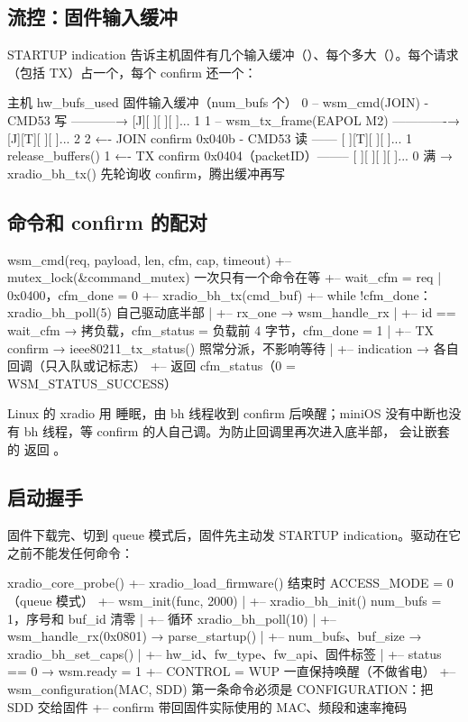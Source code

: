 \subsection{流控：固件输入缓冲}

STARTUP indication 告诉主机固件有几个输入缓冲（）、每个多大（）。每个请求（包括 TX）占一个，每个 confirm 还一个：

\begin{txtcode}
主机 hw_bufs_used                          固件输入缓冲（num_bufs 个）
0 -- wsm_cmd(JOIN) - CMD53 写 -----------→ [J][ ][ ][ ]...        1
1 -- wsm_tx_frame(EAPOL M2) -------------→ [J][T][ ][ ]...        2
2 ←- JOIN confirm 0x040b - CMD53 读 ------ [ ][T][ ][ ]...        1   release_buffers()
1 ←- TX confirm 0x0404（packetID）-------- [ ][ ][ ][ ]...        0
满 → xradio_bh_tx() 先轮询收 confirm，腾出缓冲再写
\end{txtcode}

\subsection{命令和 confirm 的配对}

\begin{txtcode}
wsm_cmd(req, payload, len, cfm, cap, timeout)
+-- mutex_lock(&command_mutex)                一次只有一个命令在等
+-- wait_cfm = req | 0x0400，cfm_done = 0
+-- xradio_bh_tx(cmd_buf)
+-- while !cfm_done：xradio_bh_poll(5)         自己驱动底半部
|   +-- rx_one → wsm_handle_rx
|       +-- id == wait_cfm → 拷负载，cfm_status = 负载前 4 字节，cfm_done = 1
|       +-- TX confirm → ieee80211_tx_status()   照常分派，不影响等待
|       +-- indication → 各自回调（只入队或记标志）
+-- 返回 cfm_status（0 = WSM_STATUS_SUCCESS）
\end{txtcode}

Linux 的 xradio 用  睡眠，由 bh 线程收到 confirm 后唤醒；miniOS 没有中断也没有 bh 线程，等 confirm 的人自己调。为防止回调里再次进入底半部， 会让嵌套的 返回 。

\subsection{启动握手}

固件下载完、切到 queue 模式后，固件先主动发 STARTUP indication。驱动在它之前不能发任何命令：

\begin{txtcode}
xradio_core_probe()
+-- xradio_load_firmware()        结束时 ACCESS_MODE = 0（queue 模式）
+-- wsm_init(func, 2000)
|   +-- xradio_bh_init()          num_bufs = 1，序号和 buf_id 清零
|   +-- 循环 xradio_bh_poll(10)
|       +-- wsm_handle_rx(0x0801) → parse_startup()
|           +-- num_bufs、buf_size → xradio_bh_set_caps()
|           +-- hw_id、fw_type、fw_api、固件标签
|           +-- status == 0 → wsm.ready = 1
+-- CONTROL = WUP                 一直保持唤醒（不做省电）
+-- wsm_configuration(MAC, SDD)   第一条命令必须是 CONFIGURATION：把 SDD 交给固件
    +-- confirm 带回固件实际使用的 MAC、频段和速率掩码
\end{txtcode}

